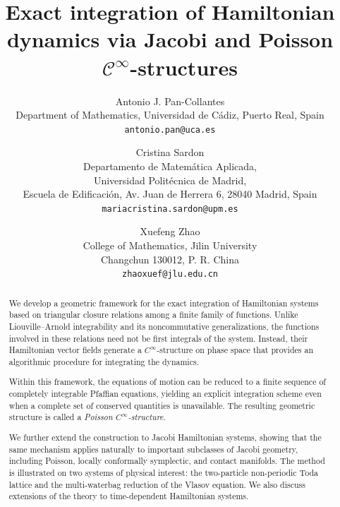 \documentclass{article}
\theoremstyle{remark}
\theoremstyle{definition}
\newcommand{\cinf}{$\mathcal{C}^{\infty}$}
\begin{document}
\title{Exact integration of Hamiltonian dynamics via Jacobi and Poisson \texorpdfstring{\cinf}{cinf}-structures}


\author{
Antonio J. Pan-Collantes\\
Department of Mathematics, Universidad de C\'{a}diz, Puerto Real, Spain\\
\texttt{antonio.pan@uca.es}\\
\and
Cristina Sardon\\
Departamento de Matemática Aplicada,\\
Universidad Politécnica de Madrid,\\
Escuela de Edificación, Av. Juan de Herrera 6, 28040 Madrid, Spain\\
\texttt{mariacristina.sardon@upm.es}
\and
Xuefeng Zhao\\
College of Mathematics, Jilin University\\
Changchun 130012, P. R. China\\
\texttt{zhaoxuef@jlu.edu.cn}
}
\maketitle


\thispagestyle{firstpage}  %

\begin{abstract}
We develop a geometric framework for the exact integration of Hamiltonian systems based on triangular closure relations among a finite family of functions. Unlike Liouville–Arnold integrability and its noncommutative generalizations, the functions involved in these relations need not be first integrals of the system. Instead, their Hamiltonian vector fields generate a $C^\infty$-structure on phase space that provides an algorithmic procedure for integrating the dynamics.

Within this framework, the equations of motion can be reduced to a finite sequence of completely integrable Pfaffian equations, yielding an explicit integration scheme even when a complete set of conserved quantities is unavailable. The resulting geometric structure is called a \emph{Poisson $C^\infty$-structure}.

We further extend the construction to Jacobi Hamiltonian systems, showing that the same mechanism applies naturally to important subclasses of Jacobi geometry, including Poisson, locally conformally symplectic, and contact manifolds. The method is illustrated on two systems of physical interest: the two-particle non-periodic Toda lattice and the multi-waterbag reduction of the Vlasov equation. We also discuss extensions of the theory to time-dependent Hamiltonian systems.


\end{abstract}
\end{document}
